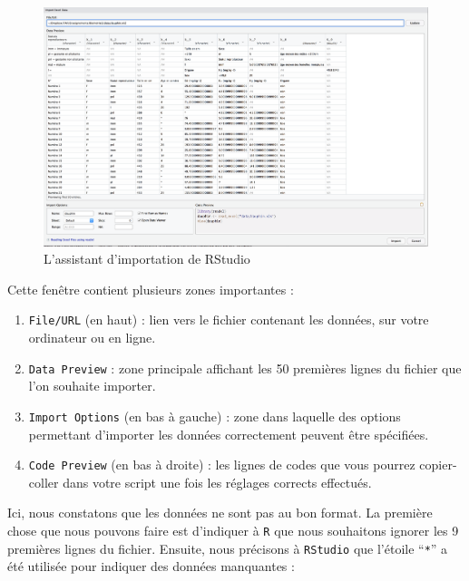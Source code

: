 \documentclass[
  a4paper,
  DIV=11,
  numbers=noendperiod,
  oneside]{scrreprt}
\providecommand{\tightlist}{%
  \setlength{\itemsep}{0pt}\setlength{\parskip}{0pt}}\usepackage{longtable,booktabs,array}
\begin{document}
\begin{figure}[H]

{\centering \includegraphics[width=1\textwidth,height=\textheight]{images/import2.png}

}

\caption{L'assistant d'importation de RStudio}

\end{figure}%

Cette fenêtre contient plusieurs zones importantes :

\begin{enumerate}
\def\labelenumi{\arabic{enumi}.}
\tightlist
\item
  \texttt{File/URL} (en haut) : lien vers le fichier contenant les
  données, sur votre ordinateur ou en ligne.
\item
  \texttt{Data\ Preview} : zone principale affichant les 50 premières
  lignes du fichier que l'on souhaite importer.
\item
  \texttt{Import\ Options} (en bas à gauche) : zone dans laquelle des
  options permettant d'importer les données correctement peuvent être
  spécifiées.
\item
  \texttt{Code\ Preview} (en bas à droite) : les lignes de codes que
  vous pourrez copier-coller dans votre script une fois les réglages
  corrects effectués.
\end{enumerate}

Ici, nous constatons que les données ne sont pas au bon format. La
première chose que nous pouvons faire est d'indiquer à \texttt{R} que
nous souhaitons ignorer les 9 premières lignes du fichier. Ensuite, nous
précisons à \texttt{RStudio} que l'étoile ``\texttt{*}'' a été utilisée
pour indiquer des données manquantes :
\end{document}
